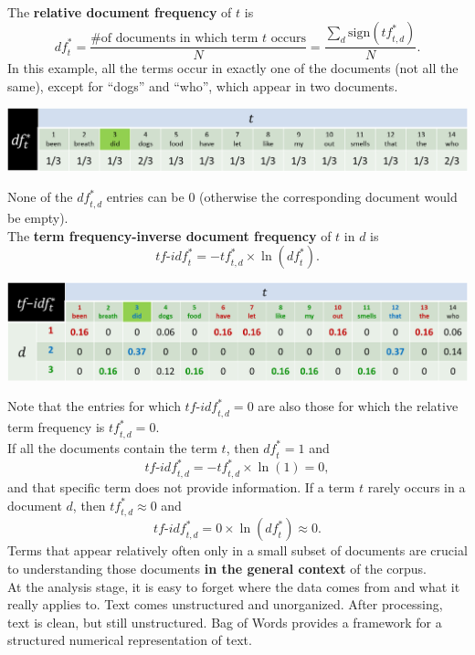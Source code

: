 \documentclass[20pt,landscape,footrule,headrule]{foils}
\newcommand{\newl}{\newline\newline}
\begin{document}
{{\newpage\ \\ \noindent The \textbf{relative document frequency} of $t$ is $$\textit{df}^*_{t}=\frac{\text{\# of documents in which term $t$ occurs}}{N}=\frac{\sum_d{\text{sign}(\textit{tf}^*_{t,d})}}{N}.$$
In this example, all the terms occur in exactly one of the documents (not all the same), except for ``dogs'' and ``who'', which appear in two documents. 
\begin{center} 
\includegraphics[width=\textwidth]{Images/df}
\end{center} None of the $\textit{df}^*_{t,d}$ entries can be $0$ (otherwise the corresponding document would be empty).  \newpage\ \\ \noindent The \textbf{term frequency-inverse document frequency} of $t$ in $d$ is 
$$\textit{tf-idf}^*_{t}=-\textit{tf}^*_{t,d}\times \ln(\textit{df}^*_{t}).$$
\begin{center}\includegraphics[width=\textwidth]{Images/tf-idf}
\end{center}
Note that the entries for which $\textit{tf-idf}^*_{t,d}=0$ are also those for which the relative term frequency is $\textit{tf}^*_{t,d}=0$. 
\newpage\ \\ \noindent 
If all the documents contain the term $t$, then $\textit{df}^*_{t}=1$ and
$$\textit{tf-idf}^*_{t,d}=-\textit{tf}^*_{t,d}\times \ln (1)=0,$$ and that specific term does not provide information.
\newl If a term $t$ rarely occurs in a document $d$, then $\textit{tf}^*_{t,d}\approx 0$ and
$$\textit{tf-idf}^*_{t,d}= 0 \times \ln (\textit{df}^*_{t})\approx 0.$$
Terms that appear relatively often only in a small subset of documents are crucial to understanding those documents \textbf{in the general context} of the corpus.
\newpage\ \\ \noindent At the analysis stage, it is easy to forget where the data comes from and what it really applies to.
\newl 
Text comes unstructured and unorganized. After processing, text is clean, but still unstructured. Bag of Words provides a framework for a structured numerical representation of text.
}}
\end{document}
